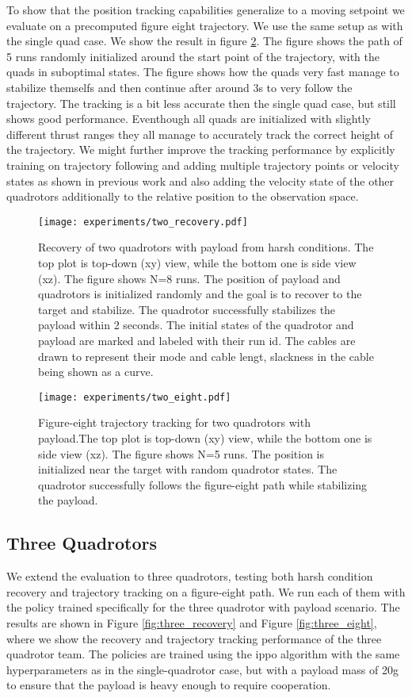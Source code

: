 To show that the position tracking capabilities generalize to a moving setpoint we evaluate on a precomputed figure eight trajectory. We use the same setup as with the single quad case. We show the result in figure \ref{fig:two_eight}. The figure shows the path of 5 runs randomly initialized around the start point of the trajectory, with the quads in suboptimal states. The figure shows how the quads very fast manage to stabilize themselfs and then continue after around 3s to very follow the trajectory. The tracking is a bit less accurate then the single quad case, but still shows good performance. Eventhough all quads are initialized with slightly different thrust ranges they all manage to accurately track the correct height of the trajectory. We might further improve the tracking performance by explicitly training on trajectory following and adding multiple trajectory points or velocity states as shown in previous work and also adding the velocity state of the other quadrotors additionally to the relative position to the observation space.
\begin{figure}[ht]
    \centering
    \texttt{[image: experiments/two\_recovery.pdf]}
    \caption{Recovery of two quadrotors with payload from harsh conditions. The top plot is top-down  (xy) view, while the bottom one is side view (xz).
    The figure shows N=8 runs. The position of payload and quadrotors is initialized randomly and the goal is to recover to the target and stabilize. The quadrotor successfully stabilizes the payload within 2 seconds. The initial states of the quadrotor and payload are marked and labeled with their run id. The cables are drawn to represent their mode and cable lengt, slackness in the cable being shown as a curve.}
    \label{fig:two_recovery}
\end{figure}
\begin{figure}[ht]
    \centering
    
    \texttt{[image: experiments/two\_eight.pdf]}
    \caption{Figure-eight trajectory tracking for two quadrotors with payload.The top plot is top-down  (xy) view, while the bottom one is side view (xz). The figure shows N=5 runs. The position is initialized near the target with random quadrotor states. The quadrotor successfully follows the figure-eight path while stabilizing the payload.}
    \label{fig:two_eight}
\end{figure}
\subsection{Three Quadrotors}
We extend the evaluation to three quadrotors, testing both harsh condition recovery and trajectory tracking on a figure-eight path. We run each of them with the policy trained specifically for the three quadrotor with payload scenario. The results are shown in Figure \ref{fig:three_recovery} and Figure \ref{fig:three_eight}, where we show the recovery and trajectory tracking performance of the three quadrotor team. The policies are trained using the \gls{ippo} algorithm with the same hyperparameters as in the single-quadrotor case, but with a payload mass of 20g to ensure that the payload is heavy enough to require cooperation.

